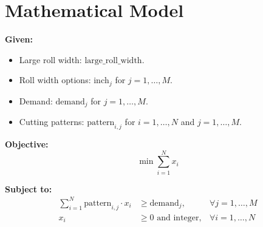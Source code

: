 \documentclass{article}
\begin{document}
\section*{Mathematical Model}

\textbf{Given:}
\begin{itemize}
    \item Large roll width: \( \text{large\_roll\_width} \).
    \item Roll width options: \( \text{inch}_j \) for \( j = 1, \ldots, M \).
    \item Demand: \( \text{demand}_j \) for \( j = 1, \ldots, M \).
    \item Cutting patterns: \( \text{pattern}_{i,j} \) for \( i = 1, \ldots, N \) and \( j = 1, \ldots, M \).
\end{itemize}

\textbf{Objective:}
\[
\min \sum_{i=1}^{N} x_i
\]

\textbf{Subject to:}
\begin{align*}
    \sum_{i=1}^{N} \text{pattern}_{i,j} \cdot x_i & \geq \text{demand}_j, & \forall j = 1, \ldots, M \\
    x_i & \geq 0 \text{ and integer}, & \forall i = 1, \ldots, N
\end{align*}
\end{document}
